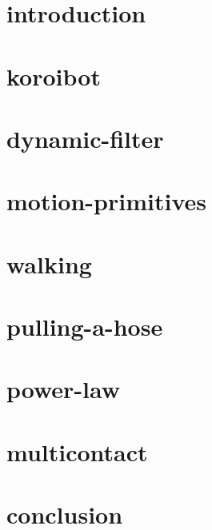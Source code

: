 \documentclass{beamer}
\begin{document}
\begin{frame}{}
  \titlepage
\end{frame}

\section{introduction}
\setcounter{subsection}{1}

\section{koroibot}
\setcounter{subsection}{2}

\section{dynamic-filter}
\setcounter{subsection}{3}


\section{motion-primitives}
\setcounter{subsection}{4}


\section{walking}
\setcounter{subsection}{5}

\section{pulling-a-hose}
\setcounter{subsection}{6}

\section{power-law}
\setcounter{subsection}{7}

\section{multicontact}
\setcounter{subsection}{8}

\section{conclusion}
\setcounter{subsection}{9}
\end{document}
